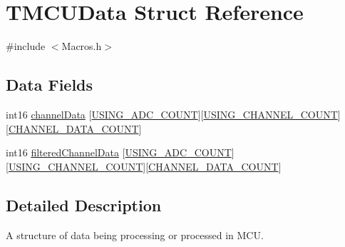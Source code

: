 \hypertarget{struct_t_m_c_u_data}{\section{T\-M\-C\-U\-Data Struct Reference}
\label{struct_t_m_c_u_data}
}


{\ttfamily \#include $<$Macros.\-h$>$}

\subsection*{Data Fields}
\begin{DoxyCompactItemize}
\item 
int16 \hyperlink{struct_t_m_c_u_data_aef7d4db6ea39953bacce61c20af6a1c5}{channel\-Data} \mbox{[}\hyperlink{group___a_d_c_const_gaca9e5377ccfd63366108499355649849}{U\-S\-I\-N\-G\-\_\-\-A\-D\-C\-\_\-\-C\-O\-U\-N\-T}\mbox{]}\mbox{[}\hyperlink{group___a_d_c_const_gadee91c7f97e44412335dbe4713a29613}{U\-S\-I\-N\-G\-\_\-\-C\-H\-A\-N\-N\-E\-L\-\_\-\-C\-O\-U\-N\-T}\mbox{]}\mbox{[}\hyperlink{group___a_r_m_const_ga50e0cf6a0eda6888a94b16f97f149d01}{C\-H\-A\-N\-N\-E\-L\-\_\-\-D\-A\-T\-A\-\_\-\-C\-O\-U\-N\-T}\mbox{]}
\item 
int16 \hyperlink{struct_t_m_c_u_data_a1d78433e8986060ae6ca53c035c65619}{filtered\-Channel\-Data} \mbox{[}\hyperlink{group___a_d_c_const_gaca9e5377ccfd63366108499355649849}{U\-S\-I\-N\-G\-\_\-\-A\-D\-C\-\_\-\-C\-O\-U\-N\-T}\mbox{]}\mbox{[}\hyperlink{group___a_d_c_const_gadee91c7f97e44412335dbe4713a29613}{U\-S\-I\-N\-G\-\_\-\-C\-H\-A\-N\-N\-E\-L\-\_\-\-C\-O\-U\-N\-T}\mbox{]}\mbox{[}\hyperlink{group___a_r_m_const_ga50e0cf6a0eda6888a94b16f97f149d01}{C\-H\-A\-N\-N\-E\-L\-\_\-\-D\-A\-T\-A\-\_\-\-C\-O\-U\-N\-T}\mbox{]}
\end{DoxyCompactItemize}


\subsection{Detailed Description}
A structure of data being processing or processed in M\-C\-U. 

